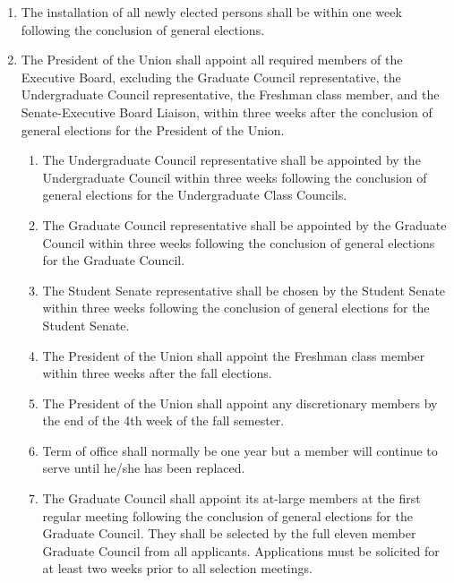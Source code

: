 


\begin{enumerate}
\item The installation of all newly elected persons shall be within one week following the conclusion of general elections.
\item The President of the Union shall appoint all required members of the Executive Board, excluding the Graduate Council representative, the Undergraduate Council representative, the Freshman class member, and the Senate-Executive Board Liaison, within three weeks after the conclusion of general elections for the President of the Union.
  \begin{enumerate}
  \item The Undergraduate Council representative shall be appointed by the Undergraduate Council within three weeks following the conclusion of general elections for the Undergraduate Class Councils.
  \item The Graduate Council representative shall be appointed by the Graduate Council within three weeks following the conclusion of general elections for the Graduate Council.
  \item The Student Senate representative shall be chosen by the Student Senate within three weeks following the conclusion of general elections for the Student Senate.
  \item The President of the Union shall appoint the Freshman class member within three weeks after the fall elections.
  \item The President of the Union shall appoint any discretionary members by the end of the 4th week of the fall semester.
  \item Term of office shall normally be one year but a member will continue to serve until he/she has been replaced.
  \item The Graduate Council shall appoint its at-large members at the first regular meeting following the conclusion of general elections for the Graduate Council. They shall be selected by the full eleven member Graduate Council from all applicants. Applications must be solicited for at least two weeks prior to all selection meetings.
  \end{enumerate}
\end{enumerate}

